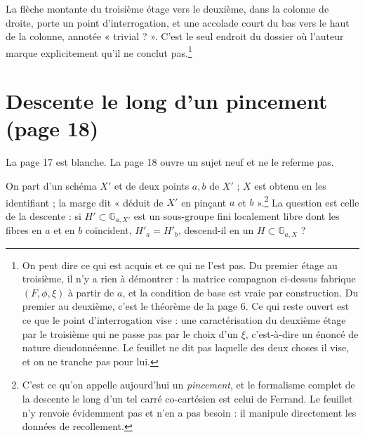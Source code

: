 \documentclass[11pt,a4paper]{article}
\begin{document}
La flèche montante du troisième étage vers le deuxième, dans la colonne de
droite, porte un point d'interrogation, et une accolade court du bas vers le
haut de la colonne, annotée « trivial ? ». C'est le seul endroit du dossier
où l'auteur marque explicitement qu'il ne conclut pas.\footnote{On peut dire
ce qui est acquis et ce qui ne l'est pas. Du premier étage au troisième, il
n'y a rien à démontrer : la matrice compagnon ci-dessus fabrique
$(F, \phi, \xi)$ à partir de $a$, et la condition de base est vraie par
construction. Du premier au deuxième, c'est le théorème de la page 6. Ce qui
reste ouvert est ce que le point d'interrogation vise : une caractérisation
du deuxième étage par le troisième qui ne passe pas par le choix d'un $\xi$,
c'est-à-dire un énoncé de nature dieudonnéenne. Le feuillet ne dit pas
laquelle des deux choses il vise, et on ne tranche pas pour lui.}

\section*{Descente le long d'un pincement (page 18)}

La page 17 est blanche. La page 18 ouvre un sujet neuf et ne le referme pas.

On part d'un schéma $X'$ et de deux points $a, b$ de $X'$ ; $X$ est obtenu
en les identifiant ; la marge dit « déduit de $X'$ en pinçant $a$ et
$b$ ».\footnote{C'est ce qu'on appelle aujourd'hui un \emph{pincement}, et
le formalisme complet de la descente le long d'un tel carré co-cartésien est
celui de Ferrand. Le feuillet n'y renvoie évidemment pas et n'en a pas
besoin : il manipule directement les données de recollement.} La question
est celle de la descente : si $H' \subset \mathbb{G}_{a,X'}$ est un
sous-groupe fini localement libre dont les fibres en $a$ et en $b$
coïncident, $H'_a = H'_b$, descend-il en un $H \subset \mathbb{G}_{a,X}$ ?
\end{document}
